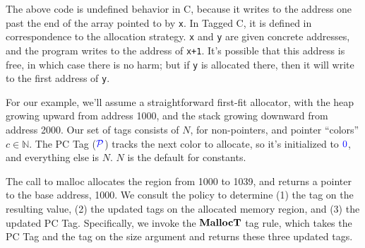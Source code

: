 \documentclass[acmsmall,review,anonymous]{acmart}\settopmatter{printfolios=true,printccs=false,printacmref=false}
\begin{document}
The above code is undefined behavior in C, because it writes to the address one past the end
of the array pointed to by {\tt x}. In Tagged C, it is defined in correspondence to
the allocation strategy. {\tt x} and {\tt y} are given concrete addresses, and the program
writes to the address of {\tt x+1}. It's possible that this address is free, in which case
there is no harm; but if {\tt y} is allocated there, then it will write to the first address
of {\tt y}.

For our example, we'll assume a straightforward first-fit allocator, with the heap growing upward
from address 1000, and the stack growing downward from address 2000. Our set of tags consists of
\(N\), for non-pointers, and pointer ``colors'' \(c \in \mathbb{N}\). The PC Tag
(\(\mathcal{\color{blue} P}\)) tracks the next color to allocate, so it's initialized to \({\color{blue} 0}\), and everything else is \(N\).
\(N\) is the default for constants.

\vspace{\abovedisplayskip}


\vspace{4\belowdisplayskip}

The call to malloc allocates the region from 1000 to 1039, and returns a pointer to the base
address, 1000. We consult the policy to determine (1) the tag on the resulting value,
(2) the updated tags on the allocated memory region, and (3) the updated PC Tag.
Specifically, we invoke the \(\mathbf{MallocT}\) tag rule, which takes the PC Tag and the tag on
the size argument and returns these three updated tags.
\end{document}
